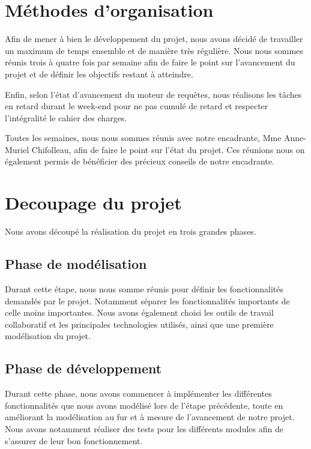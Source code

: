 \documentclass[oneside,13pt,a4paper]{report}
\begin{document}
\section{Méthodes d’organisation}

Afin de mener à bien le développement du projet, nous avons décidé de travailler un maximum de temps ensemble et de manière très régulière. Nous nous sommes réunis trois à quatre fois par semaine afin de faire le point sur l’avancement du projet et de définir les objectifs restant à atteindre.

Enfin, selon l’état d’avancement du moteur de requêtes, nous réalisons les tâches en retard durant le week-end pour ne pas cumulé de retard et respecter l’intégralité le cahier des charges.

Toutes les semaines, nous nous sommes réunis avec notre encadrante, Mme Anne-Muriel Chifolleau, afin de faire le point sur l’état du projet. Ces réunions nous on également permis de bénéficier des précieux conseils de notre encadrante.

\section{Decoupage du projet}

Nous avons découpé la réalisation du projet en trois grandes phases.

\subsection{Phase de modélisation}

Durant cette étape, nous nous somme réunis pour définir les fonctionnalités demandés par le projet. Notamment séparer les fonctionnalités importants de celle moins importantes. Nous avons également choisi les outils de travail collaboratif et les principales technologies utilisés, ainsi que une première modélisation du projet.

\subsection{Phase de développement}

Durant cette phase, nous avons commencer à implémenter les différentes fonctionnalités que nous avons modélisé lors de l’étape précédente, toute en améliorant la modélisation au fur et à mesure de l’avancement de notre projet. Nous avons notamment réaliser des tests pour les différents modules afin de s’assurer de leur bon fonctionnement.
\end{document}
